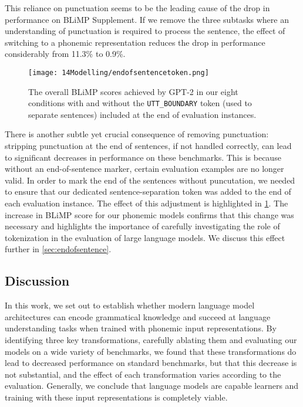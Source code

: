 This reliance on punctuation seems to be the leading cause of the drop in performance on BLiMP Supplement. If we remove the three subtasks where an understanding of punctuation is required to process the sentence, the effect of switching to a phonemic representation reduces the drop in performance considerably from 11.3\% to 0.9\%.

\begin{figure}[t]
    \centering
    \texttt{[image: 14Modelling/endofsentencetoken.png]}
    \caption{The overall BLiMP scores achieved by GPT-2 in our eight conditions with and without the \texttt{UTT\_BOUNDARY} token (used to separate sentences) included at the end of evaluation instances.}
    \label{fig:endofsentencetoken}
\end{figure}

There is another subtle yet crucial consequence of removing punctuation: stripping punctuation at the end of sentences, if not handled correctly, can lead to significant decreases in performance on these benchmarks. This is because without an end-of-sentence marker, certain evaluation examples are no longer valid. In order to mark the end of the sentences without puncutation, we needed to ensure that our dedicated sentence-separation token was added to the end of each evaluation instance. The effect of this adjustment is highlighted in \cref{fig:endofsentencetoken}. The increase in BLiMP score for our phonemic models confirms that this change was necessary and highlights the importance of carefully investigating the role of tokenization in the evaluation of large language models. We discuss this effect further in \cref{sec:endofsentence}.

\subsection{Discussion}
\label{sec:gap}

In this work, we set out to establish whether modern language model architectures can encode grammatical knowledge and succeed at language understanding tasks when trained with phonemic input representations. By identifying three key transformations, carefully ablating them and evaluating our models on a wide variety of benchmarks, we found that these transformations do lead to decreased performance on standard benchmarks, but that this decrease is not substantial, and the effect of each transformation varies according to the evaluation. Generally, we conclude that language models are capable learners and training with these input representations is completely viable.

